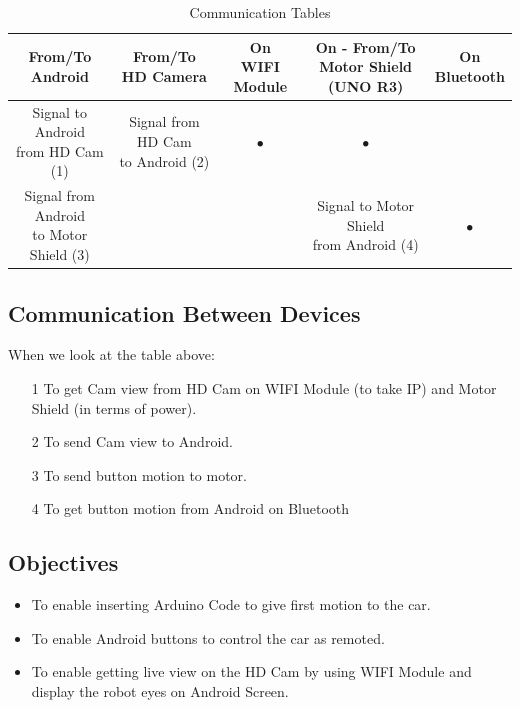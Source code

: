 \documentclass[11pt]{article}
\begin{document}
\begin{center}
\begin{table}
\begin{tabular}{ |c| c | c | c | c |}
\hline
\thead{From/To \\ Android} & \thead{From/To \\ HD Camera} & \thead{On \\ WIFI Module} & \thead{On - From/To \\ Motor Shield (UNO R3)} & \thead{On \\ Bluetooth}\\ \hline

\makecell{Signal to Android \\ from HD Cam (1)} &  \makecell{Signal from HD Cam \\ to Android (2)}  & \color{mavi}\Huge $\bullet$ & \color{mavi}\Huge $\bullet$ &   \\ \hline

\makecell{Signal from Android \\ to Motor Shield (3)} &    &  & \makecell{Signal to Motor Shield \\ from Android (4)} & \color{mavi}\Huge $\bullet$   \\ \hline
\end{tabular}
\caption{Communication Tables}
\end{table}
\end{center}

\subsection{Communication Between Devices}
\begin{flushleft}
\hspace{0.5cm}When we look at the table above:\\
\begin{itemize}
\item[1] To get Cam view from HD Cam on WIFI Module (to take IP) and Motor Shield (in terms of power).
\item[2] To send Cam view to Android.
\item[3] To send button motion to motor.
\item[4] To get button motion from Android on Bluetooth
\end{itemize}
\end{flushleft}

\vspace{0.4cm}

\subsection{Objectives}
\begin{itemize}
\item To enable inserting Arduino Code to give first motion to the car.
\item To enable Android buttons to control the car as remoted.
\item To enable getting live view on the HD Cam by using WIFI Module and display the robot eyes on Android Screen.
\end{itemize}
\end{document}

